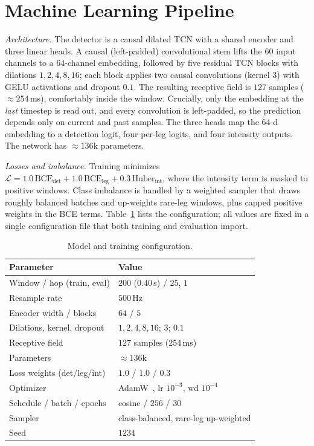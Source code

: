 \documentclass[conference]{IEEEtran}
\begin{document}
\section{Machine Learning Pipeline}
\label{sec:ml}
\emph{Architecture.} The detector is a causal dilated TCN with a shared encoder and
three linear heads. A causal (left-padded) convolutional stem lifts the $60$ input
channels to a $64$-channel embedding, followed by five residual TCN blocks with
dilations $1,2,4,8,16$; each block applies two causal convolutions (kernel $3$) with
GELU activations and dropout $0.1$. The resulting receptive field is $127$ samples
($\approx\!254$\,ms), comfortably inside the window. Crucially, only the embedding at
the \emph{last} timestep is read out, and every convolution is left-padded, so the
prediction depends only on current and past samples. The three heads map the $64$-d
embedding to a detection logit, four per-leg logits, and four intensity outputs. The
network has $\approx\!136$k parameters.

\emph{Losses and imbalance.} Training minimizes
$\mathcal{L}=1.0\,\text{BCE}_{\text{det}}+1.0\,\text{BCE}_{\text{leg}}
+0.3\,\text{Huber}_{\text{int}}$, where the intensity term is masked to positive
windows. Class imbalance is handled by a weighted sampler that draws roughly balanced
batches and up-weights rare-leg windows, plus capped positive weights in the BCE
terms. Table~\ref{tab:hp} lists the configuration; all values are fixed in a single
configuration file that both training and evaluation import.

\begin{table}[t]
\centering
\caption{Model and training configuration.}
\label{tab:hp}
\small
\begin{tabular}{@{}ll@{}}
\toprule
Parameter & Value \\
\midrule
Window / hop (train, eval) & $200$ ($0.40$\,s) / $25$, $1$ \\
Resample rate & $500$\,Hz \\
Encoder width / blocks & $64$ / $5$ \\
Dilations, kernel, dropout & $1,2,4,8,16$; $3$; $0.1$ \\
Receptive field & $127$ samples ($254$\,ms) \\
Parameters & $\approx\!136$k \\
Loss weights (det/leg/int) & $1.0$ / $1.0$ / $0.3$ \\
Optimizer & AdamW~\cite{loshchilov2019adamw}, lr $10^{-3}$, wd $10^{-4}$ \\
Schedule / batch / epochs & cosine / $256$ / $30$ \\
Sampler & class-balanced, rare-leg up-weighted \\
Seed & $1234$ \\
\bottomrule
\end{tabular}
\end{table}
\end{document}
